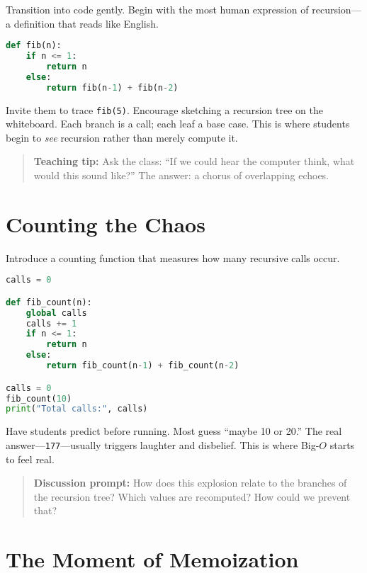 Transition into code gently.  Begin with the most human expression of
recursion—a definition that reads like English.

\begin{lstlisting}[language=Python,caption={Naive Fibonacci definition}]
def fib(n):
    if n <= 1:
        return n
    else:
        return fib(n-1) + fib(n-2)
\end{lstlisting}

Invite them to trace \texttt{fib(5)}.  Encourage sketching a recursion tree on
the whiteboard.  Each branch is a call; each leaf a base case.  This is where
students begin to \emph{see} recursion rather than merely compute it.

\begin{quote}
\textbf{Teaching tip:}
Ask the class: “If we could hear the computer think, what would this sound
like?”  The answer: a chorus of overlapping echoes.
\end{quote}

\section{Counting the Chaos}

Introduce a counting function that measures how many recursive calls occur.

\begin{lstlisting}[language=Python,caption={Instrumented Fibonacci counter}]
calls = 0

def fib_count(n):
    global calls
    calls += 1
    if n <= 1:
        return n
    else:
        return fib_count(n-1) + fib_count(n-2)

calls = 0
fib_count(10)
print("Total calls:", calls)
\end{lstlisting}

Have students predict before running.  Most guess “maybe 10 or 20.”  The real
answer—\texttt{177}—usually triggers laughter and disbelief.  This is where
Big-$O$ starts to feel real.

\begin{quote}
\textbf{Discussion prompt:}
How does this explosion relate to the branches of the recursion tree?  
Which values are recomputed?  How could we prevent that?
\end{quote}

\section{The Moment of Memoization}

